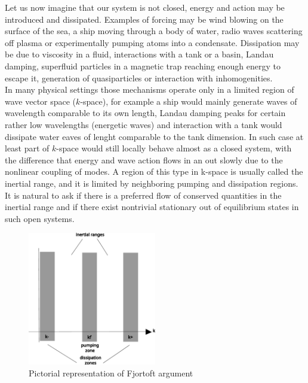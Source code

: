 Let us now imagine that our system is not closed, energy and action may be introduced and dissipated. Examples of forcing may be wind blowing on the surface of the sea, 
a ship moving through a body of water, radio waves scattering off plasma or experimentally pumping atoms into a condensate. Dissipation may be due to viscosity in a fluid,
interactions with a tank or a basin, Landau damping, superfluid particles in a magnetic trap reaching enough energy to escape it, generation of quasiparticles or interaction 
with inhomogenities.\\
In many physical settings those mechanisms operate only in a limited region of wave vector space ($k$-space), for example a ship would mainly generate waves of wavelength comparable to 
its own length, Landau damping peaks for certain rather low wavelengths (energetic waves) and interaction with a tank would dissipate water eaves of lenght comparable to the tank dimension. In such 
case at least part of  $k$-space would still locally behave almost as a closed system, with the difference that energy and wave action flows in an out slowly due to the nonlinear 
coupling of modes. A region of this type in k-space is usually called the inertial range, and it is limited by neighboring pumping and dissipation regions.\\
It is natural to ask if there is a preferred flow of conserved quantities in the inertial range and if there exist nontrivial stationary out of equilibrium 
states in such open systems. \\
\begin{figure} %
    \centering
    \includegraphics[width=0.5\textwidth]{images/Fjortoft.pdf}
    \caption{Pictorial representation of Fjortoft argument}
\end{figure}

